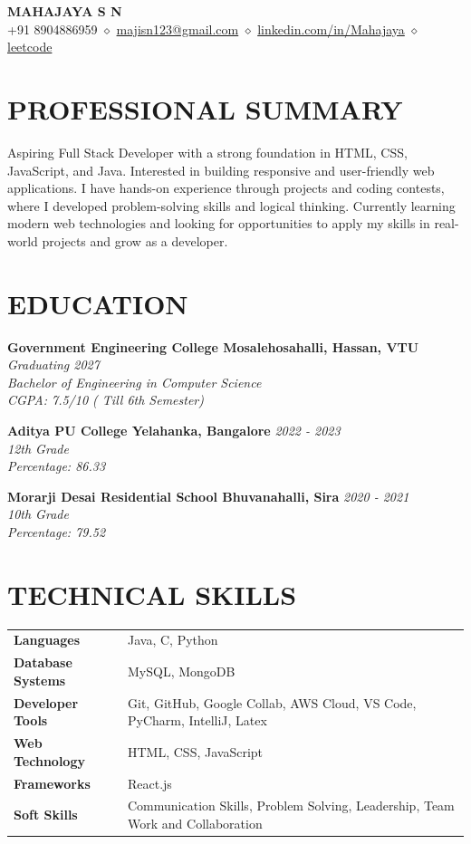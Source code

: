 \documentclass[9.5pt,a4paper]{extarticle}
\begin{document}
\begin{center}
{\Large \textbf{MAHAJAYA S N}} \\ \vspace{2pt}
+91 8904886959 $\diamond$ \href{mailto:majisn123@gmail.com}{majisn123@gmail.com} $\diamond$ \href{https://linkedin.com/in/Mahajaya}{linkedin.com/in/Mahajaya} $\diamond$ \href{https://leetcode.com}{leetcode}
\end{center}
\section*{PROFESSIONAL SUMMARY}
Aspiring Full Stack Developer with a strong foundation in HTML, CSS, JavaScript, and Java. Interested in building responsive and user-friendly web applications. I have hands-on experience through projects and coding contests, where I developed problem-solving skills and logical thinking. Currently learning modern web technologies and looking for opportunities to apply my skills in real-world projects and grow as a developer.
\section*{EDUCATION}
\noindent \textbf{Government Engineering College Mosalehosahalli, Hassan, VTU} \hfill \textit{Graduating 2027} \\
\textit{Bachelor of Engineering in Computer Science} \\
\textit{CGPA: 7.5/10 ( Till 6th Semester)} \vspace{4pt}

\noindent \textbf{Aditya PU College Yelahanka, Bangalore} \hfill \textit{2022 - 2023} \\
\textit{12th Grade} \\
\textit{Percentage: 86.33} \vspace{4pt}

\noindent \textbf{Morarji Desai Residential School Bhuvanahalli, Sira} \hfill \textit{2020 - 2021} \\
\textit{10th Grade} \\
\textit{Percentage: 79.52}
\section*{TECHNICAL SKILLS}
\begin{tabular}{@{}p{1.5in}p{5.4in}@{}}
\textbf{Languages} & Java, C, Python \\
\textbf{Database Systems} & MySQL, MongoDB \\
\textbf{Developer Tools} & Git, GitHub, Google Collab, AWS Cloud, VS Code, PyCharm, IntelliJ, Latex \\
\textbf{Web Technology} & HTML, CSS, JavaScript \\
\textbf{Frameworks} & React.js \\
\textbf{Soft Skills} & Communication Skills, Problem Solving, Leadership, Team Work and Collaboration \\
\end{tabular}
\end{document}
